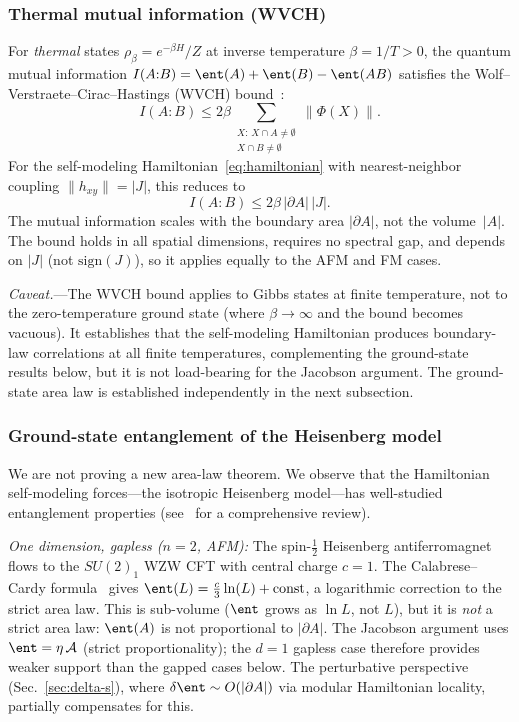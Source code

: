 \subsubsection{Thermal mutual information (WVCH)}
\label{sec:wvch}

For \emph{thermal} states $\rho_\beta = e^{-\beta H}/Z$ at inverse
temperature $\beta = 1/T > 0$, the quantum mutual information
$I(A{:}B) = \ent(A) + \ent(B) - \ent(AB)$ satisfies the
Wolf--Verstraete--Cirac--Hastings (WVCH)
bound~\cite{WVCH2008}:
\begin{equation}
  I(A{:}B) \leq 2\beta \sum_{\substack{X :\, X \cap A \neq \emptyset \\
  X \cap B \neq \emptyset}} \|\Phi(X)\|.
  \label{eq:wvch-general}
\end{equation}
For the self-modeling Hamiltonian~\eqref{eq:hamiltonian} with
nearest-neighbor coupling $\|h_{xy}\| = |J|$, this reduces to
\begin{equation}
  \boxed{I(A{:}B) \leq 2\beta\, |\partial A|\, |J|.}
  \label{eq:wvch-bound}
\end{equation}
The mutual information scales with the boundary area $|\partial A|$,
not the volume~$|A|$.  The bound holds in all spatial
dimensions, requires no spectral gap, and depends on $|J|$ (not
$\mathrm{sign}(J)$), so it applies equally to the AFM and FM cases.

\emph{Caveat.}---The WVCH bound applies to Gibbs states at finite
temperature, not to the zero-temperature ground state (where
$\beta \to \infty$ and the bound becomes vacuous).  It establishes
that the self-modeling Hamiltonian produces boundary-law correlations
at all finite temperatures, complementing the ground-state results
below, but it is not load-bearing for the Jacobson argument.  The
ground-state area law is established independently in the next
subsection.

\subsubsection{Ground-state entanglement of the Heisenberg model}
\label{sec:heisenberg-arealaw}

We are not proving a new area-law theorem.  We observe that the
Hamiltonian self-modeling forces---the isotropic Heisenberg
model---has well-studied entanglement properties
(see~\cite{EisertCramerPlenio2010} for a comprehensive review).

\emph{One dimension, gapless ($n = 2$, AFM):}  The spin-$\tfrac{1}{2}$
Heisenberg antiferromagnet flows to the $SU(2)_1$ WZW CFT with central
charge $c = 1$.  The Calabrese--Cardy
formula~\cite{CalabreseCardy2004} gives
$\ent(L) = \tfrac{c}{3}\ln(L) + \mathrm{const}$, a logarithmic
correction to the strict area law.  This is sub-volume ($\ent$ grows
as $\ln L$, not $L$), but it is \emph{not} a strict area law:
$\ent(A)$ is not proportional to $|\partial A|$.  The Jacobson
argument uses $\ent = \eta\,\mathcal{A}$ (strict proportionality);
the $d = 1$ gapless case therefore provides weaker support than the
gapped cases below.  The perturbative perspective
(Sec.~\ref{sec:delta-s}), where $\delta\ent \sim O(|\partial A|)$
via modular Hamiltonian locality, partially compensates for this.

